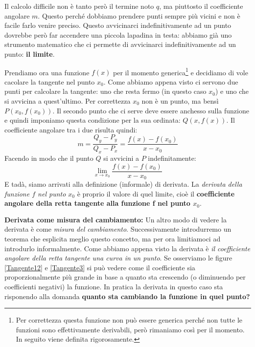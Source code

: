 Il calcolo difficile non è tanto però il termine noto $q$, ma piuttosto il coefficiente angolare $m$. Questo perché dobbiamo prendere punti sempre più vicini e non è facile farlo venire preciso. Questo avvicinarci indefinitivamente ad un punto dovrebbe però far accendere una piccola lapadina in testa: abbiamo già uno strumento matematico che ci permette di avvicinarci indefinitivamente ad un punto: \textbf{il limite}. 

Prendiamo ora una funzione $f(x)$ per il momento generica\footnote{Per correttezza questa funzione non può essere generica perché non tutte le funzioni sono effettivamente derivabili, però rimaniamo così per il momento. In seguito viene definita rigorosamente.} e decidiamo di vole cacolare la tangente nel punto $x_0$. Come abbiamo appena visto ci servono due punti per calcolare la tangente: uno che resta fermo (in questo caso $x_0$) e uno che si avvicina a quest'ultimo. Per correttezza $x_0$ non è un punto, ma bensì $P(x_0, f(x_0))$. Il secondo punto che ci serve deve essere anchesso sulla funzione e quindi imponiamo questa condizione per la sua ordinata: $Q(x, f(x))$. Il coefficiente angolare tra i due risulta quindi:
\begin{equation*}
	m = \dfrac{Q_y - P_y}{Q_x - P_x} = \dfrac{f(x) - f(x_0)}{x-x_0}
\end{equation*}
Facendo in modo che il punto $Q$ si avvicini a $P$ indefinitamente:
\begin{equation*}
	\lim_{x \to x_0} \dfrac{f(x) - f(x_0)}{x-x_0}
\end{equation*}
E tadà, siamo arrivati alla definizione (informale) di derivata. La \textit{derivata della funzione $f$ nel punto $x_0$} è proprio il valore di quel limite, cioè il \textbf{coefficiente angolare della retta tangente alla funzione f nel punto $x_0$}.


\textbf{Derivata come misura del cambiamento:} Un altro modo di vedere la derivata è come \textit{misura del cambiamento}. Successivamente introdurremo un teorema che esplicita meglio questo concetto, ma per ora limitiamoci ad introdurlo informalmente. Come abbiamo appena visto la derivata è \textit{il coefficiente angolare della retta tangente una curva in un punto}. Se osserviamo le figure \ref{Tangente12} e \ref{Tangente3} si può vedere come il coefficiente sia proporzionalmente più grande in base a quanto sta crescendo (o diminuendo per coefficienti negativi) la funzione. In pratica la derivata in questo caso sta risponendo alla domanda \textbf{quanto sta cambiando la funzione in quel punto?} 

